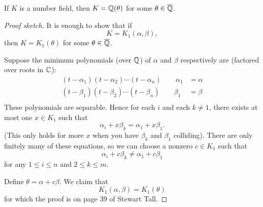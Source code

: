 \begin{theorem}
    If $K$ is a number field, then $K = \mathbb Q(\theta)$ for some $\theta\in\overline{\mathbb Q}$.
\end{theorem}
\begin{proof}[Proof sketch]
    It is enough to show that if
    \[K = K_1(\alpha, \beta), \]
    then $K = K_1(\theta)$ for some $\theta\in\overline{\mathbb Q}$.

    Suppose the minimum polynomials (over $\mathbb Q$) of $\alpha$ and $\beta$ respectively are (factored over roots in $\mathbb C$):
    \begin{align*}
        (t-\alpha_1)(t-\alpha_2)\cdots (t-\alpha_n)\qquad \alpha_1 & = \alpha \\
        (t-\beta_1)(t-\beta_2)\cdots (t-\beta_n)\qquad \beta_1     & = \beta  \\
    \end{align*}
    These polynomials are separable. Hence for each $i$ and each $k\neq 1$, there exists at most one $x\in K_1$ such that
    \[\alpha_i + x\beta_k = \alpha_1 + x\beta_1.\]
    (This only holds for more $x$ when you have $\beta_k$ and $\beta_1$ colliding). There are only finitely many of these equations, so we can choose a nonzero $c\in K_1$ such that
    \[\alpha_i + c\beta_k \neq \alpha_1 + c\beta_1\]
    for any $1\leq i\leq n$ and $2\leq k\leq m$.

    Define $\theta = \alpha + c\beta$. We claim that
    \[K_1(\alpha, \beta) = K_1(\theta)\]
    for which the proof is on page 39 of Stewart Tall.
\end{proof}